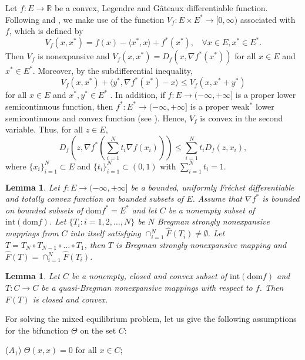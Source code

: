 \documentclass[reqno,b5paper]{amsart}
\theoremstyle{plain}
\newtheorem{lemma}[theorem]{Lemma}
\theoremstyle{definition}
\numberwithin{equation}{section}
\numberwithin{equation}{section}
\begin{document}
Let $f:E\to\mathbb{R}$ be a convex, Legendre and G\^{a}teaux differentiable function. Following \cite{alb} and \cite{cens}, we make use of the function $V_{f}:E\times E^{*}\to [0,\infty)$ associated with $f$, which is defined by
$$V_{f}(x,x^{*})=f(x)-\langle x^{*},x\rangle +f^{*}(x^{*}), \ \ \ \ \forall x\in E, x^{*}\in E^{*}.$$ 
Then $V_{f}$ is nonexpansive and $V_{f}(x,x^{*})=D_{f}(x,\nabla f^{*}(x^{*}))$ for all $x\in E$ and $x^{*}\in E^{*}$. Moreover, by the subdifferential inequality,
\begin{equation}\label{29}
V_{f}(x,x^{*})+\langle y^{*},\nabla f^{*}(x^{*})-x\rangle\leq V_{f}(x,x^{*}+y^{*})
\end{equation}
for all $x\in E$ and $x^{*},y^{*}\in E^{*}$ \cite{koh}. In addition, if $f:E\to (-\infty,+\infty]$ is a proper lower semicontinuous function, then $f^{*}:E^{*}\to(-\infty,+\infty]$ is a proper weak$^{*}$ lower semicontinuous and convex function (see \cite{mar}). Hence, $V_{f}$ is convex in the second variable. Thus, for all $z \in E$,
$$D_{f}\left(z,\nabla f^{*}\left(\sum_{i=1}^{N}t_{i}\nabla f(x_{i})\right)\right)\leq \sum_{i=1}^{N}t_{i}D_{f}(z,x_{i}),$$
where $\{x_{i}\}_{i=1}^{N}\subset E$ and $\{t_{i}\}_{i=1}^{N}\subset (0,1)$ with $\sum_{i=1}^{N}t_{i}=1$.
\begin{lemma}\label{222}\cite{mar}
Let $f:E\to(-\infty,+\infty]$ be a bounded, uniformly Fr\'{e}chet differentiable and totally convex function on bounded subsets of $E$. Assume that $\nabla f^{*}$ is bounded on bounded subsets of $\text{dom} f^{*}=E^{*}$ and let $C$ be a nonempty subset of $\text{int}(\text{dom} f)$. Let $\{T_{i} : i=1,2,\ldots,N\}$ be $N$ Bregman strongly nonexpansive mappings from $C$ into itself satisfying $\cap_{i=1}^{N}\widehat{F}(T_{i})\neq \emptyset.$ Let $T=T_{N}\circ T_{N-1}\circ\ldots \circ T_{1}$, then $T$ is Bregman strongly nonexpansive mapping and $\widehat{F}(T)=\cap_{i=1}^{N}\widehat{F}(T_{i})$.
\end{lemma}
\begin{lemma}\label{333}\cite{rei3}
Let $C$ be a nonempty, closed and convex subset of $\text{int}(\text{dom} f)$ and $T:C\to C$ be a quasi-Bregman nonexpansive mappings with respect to $f$. Then $F(T)$ is closed and convex.
\end{lemma}

For solving the mixed equilibrium problem, let us give the following assumptions for the bifunction $\Theta$ on the set $C$:

($A_{1}$) $\Theta (x,x)=0$ for all $x\in C$;
\end{document}
